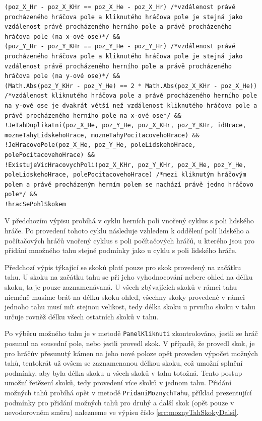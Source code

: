 \begin{lstlisting}[label=src:moznyTahSkokyPrvni,caption={Podmínky pro vytvoření možného tahu - skoky (první skok)}]
(poz_X_Hr - poz_X_KHr == poz_X_He - poz_X_Hr) /*vzdálenost právě procházeného hráčova pole a kliknutého hráčova pole je stejná jako vzdálenost právě procházeného herního pole a právě procházeného hráčova pole (na x-ové ose)*/ &&
(poz_Y_Hr - poz_Y_KHr == poz_Y_He - poz_Y_Hr) /*vzdálenost právě procházeného hráčova pole a kliknutého hráčova pole je stejná jako vzdálenost právě procházeného herního pole a právě procházeného hráčova pole (na y-ové ose)*/ &&
(Math.Abs(poz_Y_KHr - poz_Y_He) == 2 * Math.Abs(poz_X_KHr - poz_X_He)) /*vzdálenost kliknutého hráčova pole a právě procházeného herního pole na y-ové ose je dvakrát větší než vzdálenost kliknutého hráčova pole a právě procházeného herního pole na x-ové ose*/ &&
!JeTahDuplikatni(poz_X_He, poz_Y_He, poz_X_KHr, poz_Y_KHr, idHrace, mozneTahyLidskehoHrace, mozneTahyPocitacovehoHrace) &&
!JeHracovoPole(poz_X_He, poz_Y_He, poleLidskehoHrace, polePocitacovehoHrace) &&
!ExistujeVicHracovychPoli(poz_X_KHr, poz_Y_KHr, poz_X_He, poz_Y_He, poleLidskehoHrace, polePocitacovehoHrace) /*mezi kliknutým hráčovým polem a právě procházeným herním polem se nachází právě jedno hráčovo pole*/ &&
!hracSePohlSkokem 
\end{lstlisting}

V předchozím výpisu probíhá v cyklu herních polí vnořený cyklus s poli lidského hráče. Po provedení tohoto cyklu následuje vzhledem k oddělení polí lidského a počítačových hráčů vnořený cyklus s poli počítačových hráčů, u kterého jsou pro přidání množného tahu stejné podmínky jako u cyklu s poli lidského hráče. 

Předchozí výpis týkající se skoků platí pouze pro skok provedený na začátku tahu. U skoku na začátku tahu se při jeho vyhodnocování nebere ohled na délku skoku, ta je pouze zaznamenávaná. U všech zbývajících skoků v rámci tahu nicméně musíme brát na délku skoku ohled, všechny skoky provedené v rámci jednoho tahu musí mít stejnou velikost, tedy délka skoku u prvního skoku v tahu určuje rovněž délku všech ostatních skoků v tahu. 

Po výběru možného tahu je v metodě \lstinline$PanelKliknuti$ zkontrolováno, jestli se hráč posunul na sousední pole, nebo jestli provedl skok. V případě, že provedl skok, je pro hráčův přesunutý kámen na jeho nové poloze opět proveden výpočet možných tahů, tentokrát už ovšem se zaznamenanou délkou skoku, což umožní splnění podmínky, aby byla délka skoku u všech skoků v tahu totožná. Tento postup umožní řetězení skoků, tedy provedení více skoků v jednom tahu. Přidání možných tahů probíhá opět v metodě \lstinline$PridaniMoznychTahu$, příklad prezentující podmínky pro přidání možných tahů pro druhý a další skok (opět pouze v nevodorovném směru) nalezneme ve výpisu číslo \ref{src:moznyTahSkokyDalsi}.

